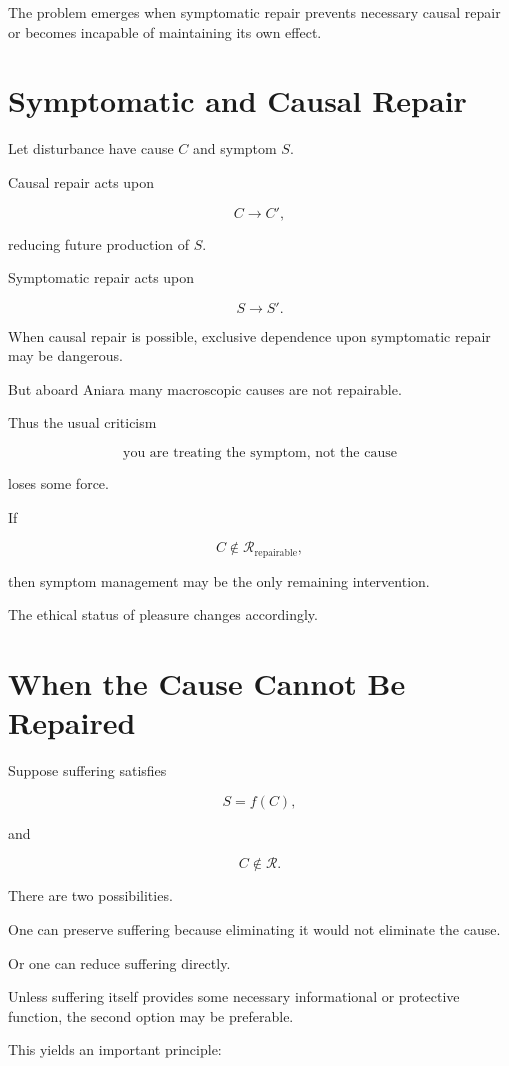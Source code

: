 \documentclass[11pt,oneside]{book}
\theoremstyle{definition}
\theoremstyle{remark}
\newcommand{\R}{\mathcal{R}}
\begin{document}
The problem emerges when symptomatic repair prevents necessary causal repair or becomes incapable of maintaining its own effect.

\section{Symptomatic and Causal Repair}

Let disturbance have cause \(C\) and symptom \(S\).

Causal repair acts upon

\[
C\rightarrow C',
\]

reducing future production of \(S\).

Symptomatic repair acts upon

\[
S\rightarrow S'.
\]

When causal repair is possible, exclusive dependence upon symptomatic repair may be dangerous.

But aboard Aniara many macroscopic causes are not repairable.

Thus the usual criticism

\[
\text{you are treating the symptom, not the cause}
\]

loses some force.

If

\[
C\notin\R_{\mathrm{repairable}},
\]

then symptom management may be the only remaining intervention.

The ethical status of pleasure changes accordingly.

\section{When the Cause Cannot Be Repaired}

Suppose suffering satisfies

\[
S=f(C),
\]

and

\[
C\notin\R.
\]

There are two possibilities.

One can preserve suffering because eliminating it would not eliminate the cause.

Or one can reduce suffering directly.

Unless suffering itself provides some necessary informational or protective function, the second option may be preferable.

This yields an important principle:
\end{document}
